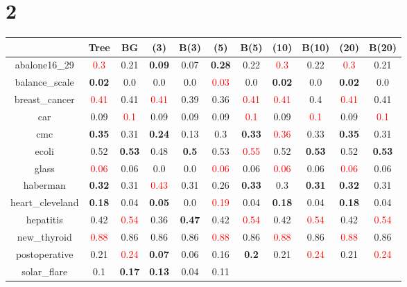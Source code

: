 \documentclass{article}%
\begin{document}
\section*{2}%
\begin{tabular}{c|cccccccccc}%
\hline%
&Tree&BG&(3)&B(3)&(5)&B(5)&(10)&B(10)&(20)&B(20)\\%
\hline%
abalone16\_29&\textcolor{red}{ 
0.3
}&0.21&\textbf{0.09}&0.07&\textbf{0.28}&0.22&\textcolor{red}{ 
0.3
}&0.22&\textcolor{red}{ 
0.3
}&0.21\\%
\hline%
balance\_scale&\textbf{0.02}&0.0&0.0&0.0&\textcolor{red}{ 
0.03
}&0.0&\textbf{0.02}&0.0&\textbf{0.02}&0.0\\%
\hline%
breast\_cancer&\textcolor{red}{ 
0.41
}&0.41&\textcolor{red}{ 
0.41
}&0.39&0.36&\textcolor{red}{ 
0.41
}&\textcolor{red}{ 
0.41
}&0.4&\textcolor{red}{ 
0.41
}&0.41\\%
\hline%
car&0.09&\textcolor{red}{ 
0.1
}&0.09&0.09&0.09&\textcolor{red}{ 
0.1
}&0.09&\textcolor{red}{ 
0.1
}&0.09&\textcolor{red}{ 
0.1
}\\%
\hline%
cmc&\textbf{0.35}&0.31&\textbf{0.24}&0.13&0.3&\textbf{0.33}&\textcolor{red}{ 
0.36
}&0.33&\textbf{0.35}&0.31\\%
\hline%
ecoli&0.52&\textbf{0.53}&0.48&\textbf{0.5}&0.53&\textcolor{red}{ 
0.55
}&0.52&\textbf{0.53}&0.52&\textbf{0.53}\\%
\hline%
glass&\textcolor{red}{ 
0.06
}&0.06&0.0&0.0&\textcolor{red}{ 
0.06
}&0.06&\textcolor{red}{ 
0.06
}&0.06&\textcolor{red}{ 
0.06
}&0.06\\%
\hline%
haberman&\textbf{0.32}&0.31&\textcolor{red}{ 
0.43
}&0.31&0.26&\textbf{0.33}&0.3&\textbf{0.31}&\textbf{0.32}&0.31\\%
\hline%
heart\_cleveland&\textbf{0.18}&0.04&\textbf{0.05}&0.0&\textcolor{red}{ 
0.19
}&0.04&\textbf{0.18}&0.04&\textbf{0.18}&0.04\\%
\hline%
hepatitis&0.42&\textcolor{red}{ 
0.54
}&0.36&\textbf{0.47}&0.42&\textcolor{red}{ 
0.54
}&0.42&\textcolor{red}{ 
0.54
}&0.42&\textcolor{red}{ 
0.54
}\\%
\hline%
new\_thyroid&\textcolor{red}{ 
0.88
}&0.86&0.86&0.86&\textcolor{red}{ 
0.88
}&0.86&\textcolor{red}{ 
0.88
}&0.86&\textcolor{red}{ 
0.88
}&0.86\\%
\hline%
postoperative&0.21&\textcolor{red}{ 
0.24
}&\textbf{0.07}&0.06&0.16&\textbf{0.2}&0.21&\textcolor{red}{ 
0.24
}&0.21&\textcolor{red}{ 
0.24
}\\%
\hline%
solar\_flare&0.1&\textbf{0.17}&\textbf{0.13}&0.04&0.11&\textcolor{red}{ 
}
\end{tabular}
\end{document}
